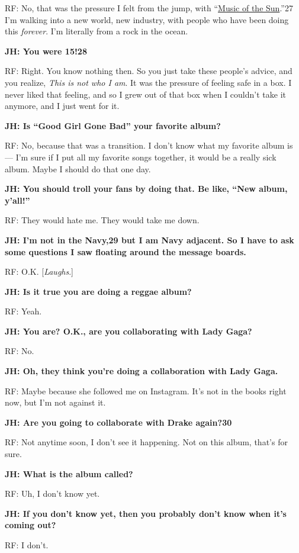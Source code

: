 RF: No, that was the pressure I felt from the jump, with
``\href{https://open.spotify.com/album/4FyGpObwABjn0o8Tdp7AZz}{Music of
the Sun}.''27 I'm walking into a new world, new industry, with people
who have been doing this \emph{forever}. I'm literally from a rock in
the ocean.

\textbf{JH: You were 15!28}

RF: Right. You know nothing then. So you just take these people's
advice, and you realize, \emph{This is not who I am}. It was the
pressure of feeling safe in a box. I never liked that feeling, and so I
grew out of that box when I couldn't take it anymore, and I just went
for it.

\textbf{JH: Is ``Good Girl Gone Bad'' your favorite album?}

RF: No, because that was a transition. I don't know what my favorite
album is --- I'm sure if I put all my favorite songs together, it would
be a really sick album. Maybe I should do that one day.

\textbf{JH: You should troll your fans by doing that. Be like, ``New
album, y'all!''}

RF: They would hate me. They would take me down.

\textbf{JH: I'm not in the Navy,29 but I am Navy adjacent. So I have to
ask some questions I saw floating around the message boards.}

RF: O.K. {[}\emph{Laughs}.{]}

\textbf{JH: Is it true you are doing a reggae album?}

RF: Yeah.

\textbf{JH: You are? O.K., are you collaborating with Lady Gaga?}

RF: No.

\textbf{JH: Oh, they think you're doing a collaboration with Lady Gaga.}

RF: Maybe because she followed me on Instagram. It's not in the books
right now, but I'm not against it.

\textbf{JH: Are you going to collaborate with Drake again?30}

RF: Not anytime soon, I don't see it happening. Not on this album,
that's for sure.

\textbf{JH: What is the album called?}

RF: Uh, I don't know yet.

\textbf{JH: If you don't know yet, then you probably don't know when
it's coming out?}

RF: I don't.


